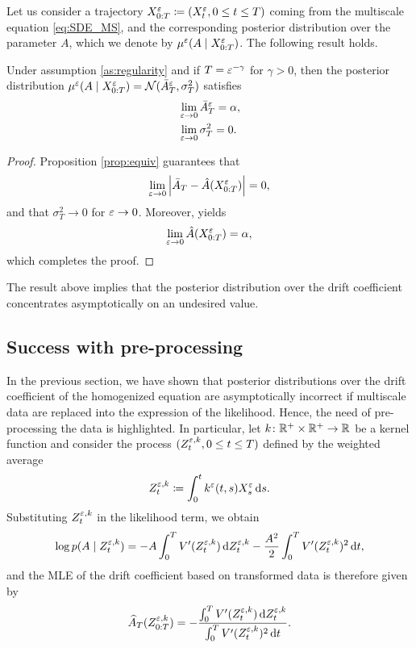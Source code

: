 \documentclass[10pt]{article}
\begin{document}
Let us consider a trajectory $X_{0:T}^\varepsilon \coloneqq (X_t^\varepsilon, 0 \leq t \leq T)$ coming from the multiscale equation \eqref{eq:SDE_MS}, and the corresponding posterior distribution over the parameter $A$, which we denote by $\mu^\varepsilon(A \mid X_{0:T}^\varepsilon)$. The following result holds.
\begin{theorem} Under assumption \ref{as:regularity} and if $T = \varepsilon^{-\gamma}$ for $\gamma > 0$, then the posterior distribution $\mu^\varepsilon(A \mid X_{0:T}^\varepsilon) = \mathcal N(\bar A^\varepsilon_T,  \sigma^2_T)$ satisfies
	\begin{equation}
	\begin{aligned}
		&\lim_{\varepsilon \to 0} \bar A^\varepsilon_T = \alpha, \\
		&\lim_{\varepsilon \to 0} \sigma^2_T = 0.
	\end{aligned}
	\end{equation}
\end{theorem}
\begin{proof} Proposition \ref{prop:equiv} guarantees that 
	\begin{equation}
		\lim_{\varepsilon \to 0} \left\lvert\bar A_T - \hat A(X^\varepsilon_{0:T})\right\rvert = 0,
	\end{equation}
	and that $\sigma^2_T \to 0$ for $\varepsilon \to 0$. Moreover, \cite[Theorem 3.4]{PaS07} yields
	\begin{equation}
		\lim_{\varepsilon \to 0} \hat A(X^\varepsilon_{0:T}) = \alpha,
	\end{equation}
	which completes the proof.
\end{proof}

The result above implies that the posterior distribution over the drift coefficient concentrates asymptotically on an undesired value.

\subsection{Success with pre-processing}


In the previous section, we have shown that posterior distributions over the drift coefficient of the homogenized equation are asymptotically incorrect if multiscale data are replaced into the expression of the likelihood. Hence, the need of pre-processing the data is highlighted. In particular, let $k \colon \mathbb{R}^+ \times \mathbb{R}^+ \to \mathbb{R}$ be a kernel function and consider the process $(Z^{\varepsilon,k}_t, 0 \leq t \leq T)$ defined by the weighted average
\begin{equation}\label{eq:ZDef}
	Z^{\varepsilon,k}_t \coloneqq \int_0^t k^\varepsilon(t, s)X^\varepsilon_s \,\mathrm{d} s.
\end{equation}
Substituting $Z^{\varepsilon, k}_t$ in the likelihood term, we obtain
\begin{equation}\label{eq:likelihood_Z}
	\log p(A \mid Z^{\varepsilon, k}_t) = -A \int_0^T V'(Z^{\varepsilon, k}_t) \,\mathrm{d} Z^{\varepsilon, k}_t - \frac{A^2}{2} \int_0^T V'(Z^{\varepsilon, k}_t)^2 \,\mathrm{d} t,
\end{equation}
and the MLE of the drift coefficient based on transformed data is therefore given by
\begin{equation}\label{eq:MLE_Z}
	\widehat A_T (Z^{\varepsilon,k}_{0:T}) = - \frac{\int_0^T V'(Z^{\varepsilon,k}_t) \,\mathrm{d} Z^{\varepsilon,k}_t}{\int_0^T V'(Z^{\varepsilon,k}_t)^2 \,\mathrm{d} t}.
\end{equation}
\end{document}
